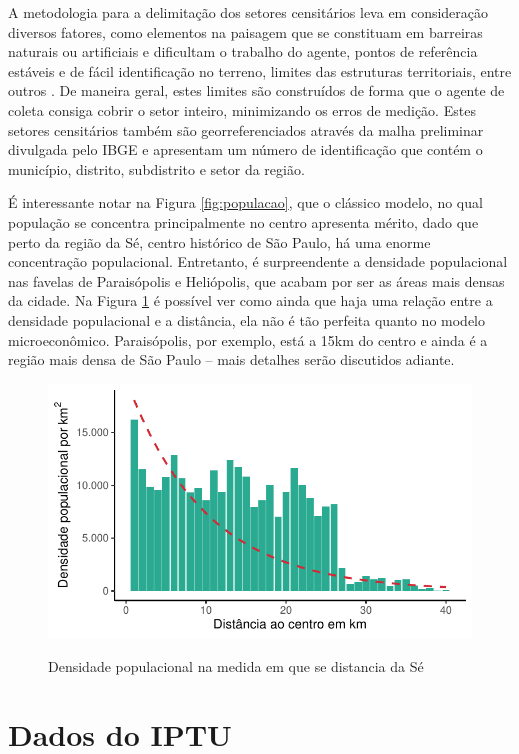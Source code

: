A metodologia para a delimitação dos setores censitários leva em consideração diversos fatores, como elementos na paisagem que se constituam em barreiras naturais ou artificiais e dificultam o trabalho do agente, pontos de referência estáveis e de fácil identificação no terreno, limites das estruturas territoriais, entre outros \cite{IBGE2024}. De maneira geral, estes limites são construídos de forma que o agente de coleta consiga cobrir o setor inteiro, minimizando os erros de medição. Estes setores censitários também são georreferenciados através da malha preliminar divulgada pelo IBGE e apresentam um número de identificação que contém o município, distrito, subdistrito e setor da região.

É interessante notar na Figura \ref{fig:populacao}, que o clássico modelo, no qual população se concentra principalmente no centro apresenta mérito, dado que perto da região da Sé, centro histórico de São Paulo, há uma enorme concentração populacional. Entretanto, é surpreendente a densidade populacional nas favelas de Paraisópolis e Heliópolis, que acabam por ser as áreas mais densas da cidade. Na Figura \ref{fig:dens-distcentro} é possível ver como ainda que haja uma relação entre a densidade populacional e a distância, ela não é tão perfeita quanto no modelo microeconômico. Paraisópolis, por exemplo, está a 15km do centro e ainda é a região mais densa de São Paulo -- mais detalhes serão discutidos adiante.

\begin{figure}[h]
    \centering
    \caption{Densidade populacional na medida em que se distancia da Sé}
    \includegraphics[width = .75\linewidth]{imagens/densidade_distcentro.pdf}
    \label{fig:dens-distcentro}
\end{figure}

\section{Dados do IPTU}

